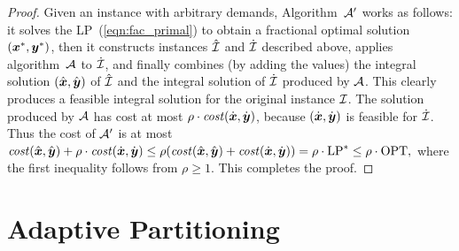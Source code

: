 \documentclass{llncs}
\begin{document}

\begin{proof}
  Given an {\FTFP} instance with arbitrary demands, Algorithm~${\cal A}'$ works
as follows: it solves the LP~(\ref{eqn:fac_primal}) to obtain a
  fractional optimal solution $(\boldsymbol{x}^\ast,\boldsymbol{y}^\ast)$, then it constructs
  instances ${\hat{\cal I}}$ and ${\dot{\cal I}}$ described above,  applies
  algorithm~${\cal A}$ to ${\dot{\cal I}}$, and finally combines (by adding
  the values) the integral solution $(\hat{\boldsymbol{x}}, \hat{\boldsymbol{y}})$ of
  ${\hat{\cal I}}$ and the integral solution of ${\dot{\cal I}}$ produced
  by ${\cal A}$. This clearly produces a feasible integral
  solution for the original instance $\mathcal{I}$.
The solution produced by ${\cal A}$ has cost at most
$\rho\cdot{\it cost}(\dot{\boldsymbol{x}},\dot{\boldsymbol{y}})$, because $(\dot{\boldsymbol{x}},\dot{\boldsymbol{y}})$
is feasible for ${\dot{\cal I}}$. Thus the cost of ${\cal A}'$ is at most
% 
$
 {\it cost}(\hat{\boldsymbol{x}}, \hat{\boldsymbol{y}}) + \rho\cdot{\it cost}(\dot{\boldsymbol{x}},\dot{\boldsymbol{y}})
	\le
 \rho({\it cost}(\hat{\boldsymbol{x}}, \hat{\boldsymbol{y}}) + {\it cost}(\dot{\boldsymbol{x}},\dot{\boldsymbol{y}}))
		= \rho\cdot\mbox{\rm LP}^\ast \le \rho\cdot\mbox{\rm OPT},
$
%
where the first inequality follows from $\rho\geq 1$. This completes
the proof.
\end{proof}


\section{Adaptive Partitioning}
\label{sec: adaptive partitioning}
\end{document}
